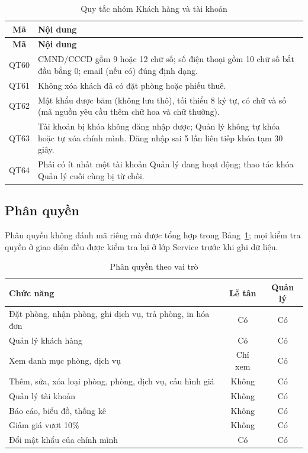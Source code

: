 \documentclass[14pt]{report}
\begin{document}
\begin{longtable}{|c|p{12cm}|}
\caption{Quy tắc nhóm Khách hàng và tài khoản}\\\hline
\textbf{Mã} & \textbf{Nội dung}\\\hline
\endfirsthead
\hline \textbf{Mã} & \textbf{Nội dung}\\\hline
\endhead
QT60 & CMND/CCCD gồm 9 hoặc 12 chữ số; số điện thoại gồm 10 chữ số bắt đầu bằng 0; email (nếu có) đúng định dạng. \\\hline
QT61 & Không xóa khách đã có đặt phòng hoặc phiếu thuê. \\\hline
QT62 & Mật khẩu được băm (không lưu thô), tối thiểu 8 ký tự, có chữ và số (mã nguồn yêu cầu thêm chữ hoa và chữ thường). \\\hline
QT63 & Tài khoản bị khóa không đăng nhập được; Quản lý không tự khóa hoặc tự xóa chính mình. Đăng nhập sai 5 lần liên tiếp khóa tạm 30 giây. \\\hline
QT64 & Phải có ít nhất một tài khoản Quản lý đang hoạt động; thao tác khóa Quản lý cuối cùng bị từ chối. \\\hline
\end{longtable}

\subsection{Phân quyền}

Phân quyền không đánh mã riêng mà được tổng hợp trong Bảng~\ref{tab:phan-quyen}; mọi kiểm tra quyền ở giao diện đều được kiểm tra lại ở lớp Service trước khi ghi dữ liệu.

\begin{table}[H]
\centering
\caption{Phân quyền theo vai trò}
\label{tab:phan-quyen}
\begin{tabularx}{\textwidth}{|X|c|c|}
\hline
\textbf{Chức năng} & \textbf{Lễ tân} & \textbf{Quản lý} \\\hline
Đặt phòng, nhận phòng, ghi dịch vụ, trả phòng, in hóa đơn & Có & Có \\\hline
Quản lý khách hàng & Có & Có \\\hline
Xem danh mục phòng, dịch vụ & Chỉ xem & Có \\\hline
Thêm, sửa, xóa loại phòng, phòng, dịch vụ, cấu hình giá & Không & Có \\\hline
Quản lý tài khoản & Không & Có \\\hline
Báo cáo, biểu đồ, thống kê & Không & Có \\\hline
Giảm giá vượt 10\% & Không & Có \\\hline
Đổi mật khẩu của chính mình & Có & Có \\\hline
\end{tabularx}
\end{table}
\end{document}
